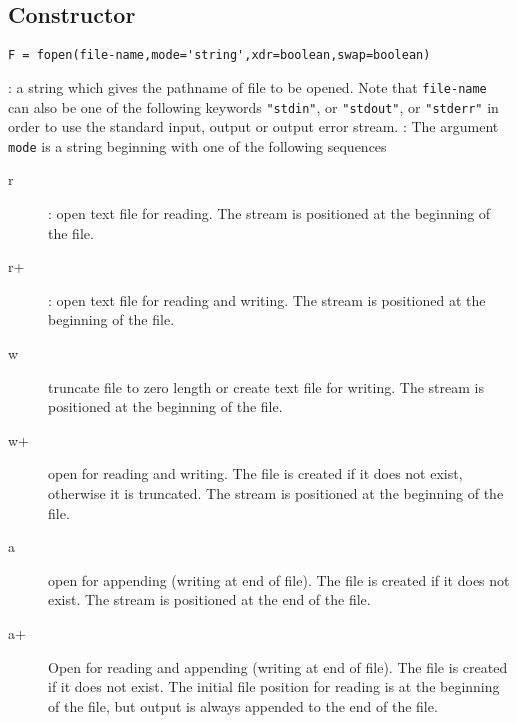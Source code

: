 
\begin{mandesc}
\end{mandesc}

\subsection*{Constructor}
\begin{verbatim}
F = fopen(file-name,mode='string',xdr=boolean,swap=boolean)
\end{verbatim}
\begin{parameters}
  \begin{varlist}
    : a string which gives the pathname of file to be opened. 
    Note that \verb+file-name+ can also be one of the following keywords \verb+"stdin"+, or 
    \verb+"stdout"+, or \verb+"stderr"+ in order to use the standard input, output or output error 
    stream.
    : The argument \verb+mode+ is a string beginning  with  one  of  the  following  sequences
    \begin{description}
      \item[r]: open text file for reading. The stream is positioned at the beginning of the
        file. 
      \item[r+]: open text file for reading and writing. The stream is positioned at the beginning of the
        file. 
      \item[w] truncate  file  to  zero  length  or create text file for writing.  The stream is
        positioned at the beginning of the file.
      \item[w+] open for reading and writing.  The file is created if it  does  not
        exist,  otherwise it is truncated.  The stream is positioned at the beginning of the file.
      \item[a] open for appending (writing at end of file).  The file is created if it does not 
	exist.  The stream is positioned at the end of the file.
      \item[a+]  Open for reading and appending (writing at end of file).  The  file
        is  created  if  it  does not exist.  The initial file position for
        reading is at the beginning of  the  file,  but  output  is  always
        appended to the end of the file.

\end{description}
\end{varlist}
\end{parameters}
